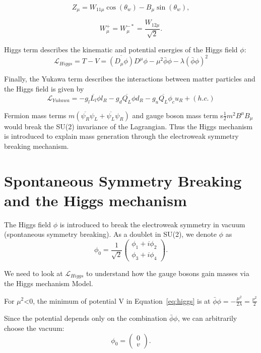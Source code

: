 \begin{equation*}
  Z_\mu=W_{11\mu}\cos\left(\theta_w\right)-B_\mu\sin\left(\theta_w\right),
\end{equation*}

\begin{equation*}
  W_\mu^+=W_\mu^{-*}=\frac{W_{12\mu}}{\sqrt{2}}.
\end{equation*}

\par Higgs term describes the kinematic and potential energies of the Higgs field $\phi$:
\begin{equation}
  \mathcal{L}_{Higgs}= T-V =\overline{\left(D_\mu\phi\right)}D^\mu\phi-\mu^2\bar{\phi}\phi-\lambda(\bar{\phi}\phi)^2
  \label{eq:higgs}
\end{equation}

Finally, the Yukawa term describes the interactions between matter particles and the Higgs field is given by
\begin{equation}
  \mathcal{L}_{Yukawa} = - g_l \overline{L_l}\phi l_R - g_d\overline{Q_L}\phi d_R -  g_u\overline{Q_L}\phi_c u_R + (h.c.)
  \label{eq:yukawa}
\end{equation}
\par Fermion mass terms $m(\overline{\psi_R}\psi_L+\overline{\psi_L}\psi_R)$ and gauge boson mass term s$\frac{1}{2}m^2 B^\mu B_\mu$ would break the SU(2) invariance of the Lagrangian. Thus the Higgs mechanism is introduced to explain mass generation through the electroweak symmetry breaking mechanism.

\section{Spontaneous Symmetry Breaking and the Higgs mechanism}
\par The Higgs field $\phi$ is introduced to break the electroweak symmetry in vacuum (spontaneous symmetry breaking).
As a doublet in SU(2), we denote $\phi$ as
\begin{equation}
  \phi_0=\frac{1}{\sqrt{2}}\left( \begin{smallmatrix} \phi_1+i\phi_2\\ \phi_3+i\phi_4 \end{smallmatrix}\right).
  \label{eq:higgsfield}
\end{equation}

\par We need to look at $ \mathcal{L}_{Higgs}$ to understand how the gauge bosons gain masses via the Higgs mechanism Model.\\
\par For $\mu^2$<$0$, the minimum of potential V in Equation~\ref{eq:higgs} is at $\bar{\phi}\phi=-\frac{\mu^2}{2\lambda}=\frac{\nu^2}{2}$
\par Since the potential depends only on the combination $\bar{\phi}\phi$, we can arbitrarily choose the vacuum:
\begin{equation}
  \phi_0=\left( \begin{smallmatrix} 0\\v \end{smallmatrix}\right).
\end{equation}

